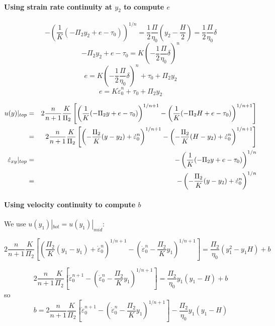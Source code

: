 \paragraph{Using strain rate continuity at $y_2$ to compute $e$}
\[
-\left( \frac{1}{K} ( -\Pi_2 y_2 +e -\tau_0 ) \right)^{1/n}
= \frac{1}{2} \frac{\Pi}{\eta_0} \left(y_2  -\frac{H}{2} \right)
= \frac{1}{2} \frac{\Pi}{\eta_0} \delta  
\]
\[
-\Pi_2 y_2 +e -\tau_0 
= K\left(-\frac{1}{2} \frac{\Pi}{\eta_0} \delta  \right)^{n} 
\]
\[
e = K\left(-\frac{1}{2} \frac{\Pi}{\eta_0} \delta  \right)^{n} + \tau_0 + \Pi_2 y_2 
\]
\[
\boxed{
e = K \dot{\varepsilon}_0^n + \tau_0 + \Pi_2 y_2 
}
\]

\begin{eqnarray}
u(y)|_{top} &=& 2 \frac{n}{n+1} \frac{K}{\Pi_2}
\left[
\left( \frac{1}{K} ( -\Pi_2 y +e -\tau_0 ) \right)^{1/n+ 1 } - 
\left( \frac{1}{K} ( -\Pi_2 H +e -\tau_0 ) \right)^{1/n+ 1 } \right] \nonumber\\
&=& 2 \frac{n}{n+1} \frac{K}{\Pi_2}
\left[
\left( -\frac{\Pi_2}{K}(y-y_2)+ \dot{\varepsilon}_0^{n}  \right)^{1/n+ 1 } - 
\left( -\frac{\Pi_2}{K}(H-y_2)+ \dot{\varepsilon}_0^{n}  \right)^{1/n+ 1 } 
\right]
\nonumber\\
\dot{\varepsilon}_{xy}|_{top}
&=&  - \left( \frac{1}{K} (- \Pi_2 y +e - \tau_0 ) \right)^{1/n} \nonumber\\
&=&  - \left( - \frac{\Pi_2}{K} (y-y_2) +  \dot{\varepsilon}_0^{n} \right)^{1/n} \nonumber
\end{eqnarray}

\paragraph{Using velocity continuity to compute $b$} 
We use $u(y_1)|_{bot}=u(y_1)|_{mid}$: 

\[
2 \frac{n}{n+1} \frac{K}{\Pi_2} \left[ \left( \frac{\Pi_2}{K} (y_1-y_1) 
+ \dot{\varepsilon}_0^{n}    \right)^{1/n+ 1 } 
- \left( \dot{\varepsilon}_0^{n}  - \frac{\Pi_2}{K}y_1     \right)^{1/n+ 1 } \right]
=
\frac{\Pi_2}{\eta_0} (y_1^2  -  y_1 H) + b
\]

\[
2 \frac{n}{n+1} \frac{K}{\Pi_2} \left[ 
\dot{\varepsilon}_0^{n+ 1} 
- \left( \dot{\varepsilon}_0^{n}  - \frac{\Pi_2}{K}y_1  \right)^{1/n+ 1 } \right]
=
\frac{\Pi_2}{\eta_0} y_1 (y_1  - H) + b
\]
so 
\[
b= 
2 \frac{n}{n+1} \frac{K}{\Pi_2} \left[ 
\dot{\varepsilon}_0^{n+ 1} 
- \left( \dot{\varepsilon}_0^{n}  - \frac{\Pi_2}{K}y_1  \right)^{1/n+ 1 } \right]
- \frac{\Pi_2}{\eta_0} y_1 (y_1  - H) 
\]

